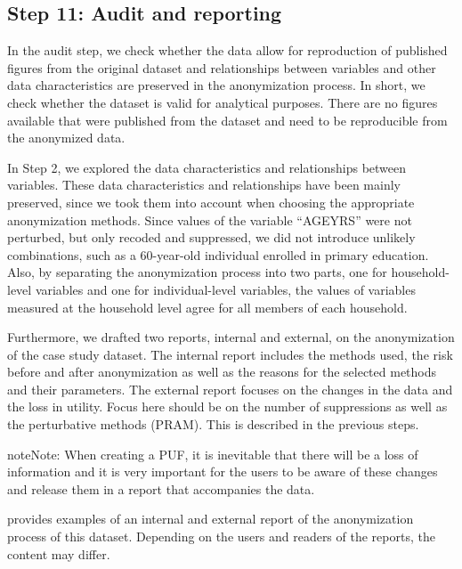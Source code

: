 \documentclass[letterpaper,10pt,english]{sphinxmanual}
\begin{document}
\subsection{Step 11: Audit and reporting}
\label{\detokenize{case_studies:id13}}
In the audit step, we check whether the data allow for reproduction of
published figures from the original dataset and relationships between
variables and other data characteristics are preserved in the
anonymization process. In short, we check whether the dataset is valid
for analytical purposes. There are no figures available that were
published from the dataset and need to be reproducible from the
anonymized data.

In Step 2, we explored the data characteristics and relationships
between variables. These data characteristics and relationships have
been mainly preserved, since we took them into account when choosing the
appropriate anonymization methods. Since values of the variable “AGEYRS”
were not perturbed, but only recoded and suppressed, we did not
introduce unlikely combinations, such as a 60-year-old individual
enrolled in primary education. Also, by separating the anonymization
process into two parts, one for household-level variables and one for
individual-level variables, the values of variables measured at the
household level agree for all members of each household.

Furthermore, we drafted two reports, internal and external, on the
anonymization of the case study dataset. The internal report includes
the methods used, the risk before and after anonymization as well as the
reasons for the selected methods and their parameters. The external
report focuses on the changes in the data and the loss in utility. Focus
here should be on the number of suppressions as well as the perturbative
methods (PRAM). This is described in the previous steps.

\begin{sphinxadmonition}{note}{Note:}
When creating a PUF, it is inevitable that there will be a loss of
information and it is very important for the users to be aware of these
changes and release them in a report that accompanies the data.
\end{sphinxadmonition}

provides examples of an internal and external report of the
anonymization process of this dataset. Depending on the users and
readers of the reports, the content may differ.
\end{document}

